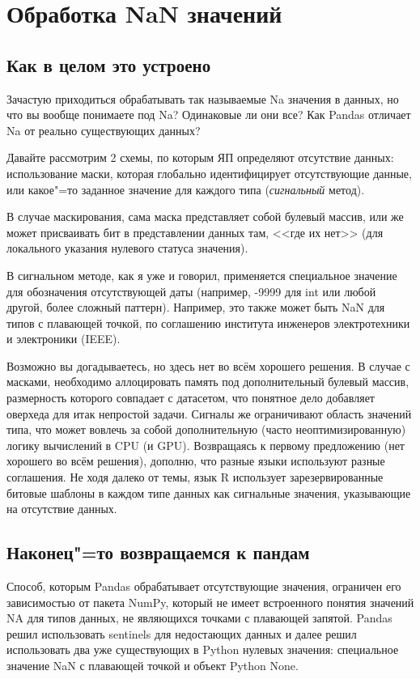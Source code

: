 \documentclass{article}
\begin{document}
\section*{Обработка NaN значений}
\subsection*{Как в целом это устроено}
Зачастую приходиться обрабатывать так называемые Na значения в данных, но что вы вообще понимаете под 
Na? Одинаковые ли они все? Как Pandas отличает Na от реально существующих данных?

Давайте рассмотрим 2 схемы, по которым ЯП определяют отсутствие данных: использование маски, которая глобально идентифицирует отсутствующие данные, или какое"=то заданное значение для каждого типа (\textit{сигнальный} метод).

В случае маскирования, сама маска представляет собой булевый массив, или же может присваивать бит в представлении данных там, <<где их нет>> (для локального указания нулевого статуса значения).

В сигнальном методе, как я уже и говорил, применяется специальное значение для обозначения отсутствующей даты (например, -9999 для int или любой другой, более сложный паттерн). Например, это также может быть NaN для типов с плавающей точкой, по соглашению института инженеров электротехники и электроники (IEEE).

Возможно вы догадываетесь, но здесь нет во всём хорошего решения. В случае с масками, необходимо аллоцировать память под дополнительный булевый массив, размерность которого совпадает с датасетом, что понятное дело добавляет оверхеда для итак непростой задачи. Сигналы же ограничивают область значений типа, что может вовлечь за собой дополнительную (часто неоптимизированную) логику вычислений в CPU (и GPU). Возвращаясь к первому предложению (нет хорошего во всём решения), дополню, что разные языки используют разные соглашения. Не ходя далеко от темы, язык R использует зарезервированные битовые шаблоны в каждом типе данных как сигнальные значения, указывающие на отсутствие данных.

\subsection*{Наконец"=то возвращаемся к пандам}
Способ, которым Pandas обрабатывает отсутствующие значения, ограничен его зависимостью от пакета NumPy, который не имеет встроенного понятия значений NA для типов данных, не являющихся точками с плавающей запятой. Pandas решил использовать sentinels для недостающих данных и далее решил использовать два уже существующих в Python нулевых значения: специальное значение NaN с плавающей точкой и объект Python None. 
\end{document}

